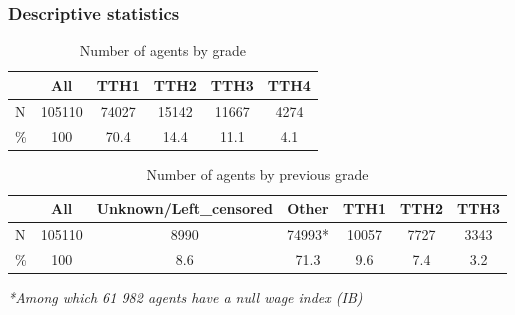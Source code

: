 \documentclass[xcolor=table,ignorenonframetext,12pt]{beamer}
\begin{document}
\begin{frame}
\frametitle{Descriptive statistics}
\begin{table}[ht]
	\caption{Number of agents by grade}
	\centering
	\begingroup\footnotesize
	\begin{tabular}{lccccc}
		\hline
		& All & TTH1 & TTH2 & TTH3 & TTH4 \\ 
		\hline
		N & 105110 & 74027 & 15142 & 11667 &  4274 \\ 
		\% & 100 & 70.4 & 14.4 & 11.1 & 4.1 \\ 
		\hline
	\end{tabular}
	\endgroup
\end{table}


\begin{table}[ht]
	\caption{Number of agents by previous grade}
	\centering
	\tiny
	\begingroup\footnotesize
	\begin{tabular}{lcccccc}
		\hline
		& All & Unknown/Left\_censored & Other & TTH1 & TTH2 & TTH3 \\ 
		\hline
		N & 105110 &  8990 & 74993* & 10057 &  7727 &  3343 \\ 
		\% & 100 & 8.6 & 71.3 & 9.6 & 7.4 & 3.2 \\ 
		\hline
	\end{tabular}
\begin{flushleft}
{\footnotesize{\textit{*Among which 61 982 agents have a null wage index (IB)}}}
\end{flushleft}
	\endgroup
\end{table}


\end{frame}
\end{document}
